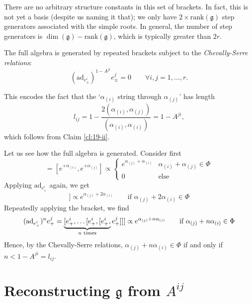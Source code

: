 
There are no arbitrary structure constants in this set of brackets.
In fact, this is not yet a basis (despite us naming it that); we only have $2 \times \text{rank}(\mathfrak{g})$ step generators associated with the simple roots. In general, the number of step generators is $\dim(\mathfrak{g}) - \text{rank}(\mathfrak{g})$, which is typically greater than $2r$.

The full algebra is generated by repeated brackets subject to the \emph{Chevally-Serre relations}:
\begin{equation}
  \boxed{(\text{ad}_{e^i_\pm})^{1 - A^{ji}} e_\pm^{j} = 0} \qquad \forall i, j = 1, \dots, r.
\end{equation}

This encodes the fact that the `$\alpha_{(i)}$ string through $\alpha_{(j)}$' has length
\begin{equation}
  l_{ij} = 1 - \frac{2(\alpha_{(i)}, \alpha_{(j)})}{(\alpha_{(i)}, \alpha_{(i)})} = 1 - A^{ji},
\end{equation}
which follows from Claim \ref{cl:19-ii}.

Let us see how the full algebra is generated. Consider first
\begin{equation}
  [e_+^{i}, e_+^{j}] = [e^{+\alpha_{(i)}}, e^{+\alpha_{(j)}}] \propto
  \begin{cases}
    e^{\alpha_{(j)} + \alpha_{(i)}} & \alpha_{(i)} + \alpha_{(j)} \in \Phi \\
    0 & \text{else}
  \end{cases}
\end{equation}
Applying $\text{ad}_{e^i_+}$ again, we get
\begin{equation}
  [e_+^{i}, [e_+^{i}, e_+^{j}]] \propto e^{\alpha_{(j)} + 2 \alpha_{(i)}} \qquad \text{if } \alpha_{(j)} + 2 \alpha_{(i)} \in \Phi
\end{equation}
Repeatedly applying the bracket, we find 
\begin{equation}
  (\text{ad}_{e_+^{i}})^n e^{j}_{+} = \underbrace{[e_+^{i}, \dots [e_+^{i}, [e_+^{i},}_{\mathclap{n \text{ times}}} e_+^{j}]]] \propto e^{\alpha_{(j)} + n \alpha_{(i)}} \qquad \text{if } \alpha_{(j)} + n \alpha_{(i)} \in \Phi
\end{equation}
Hence, by the Chevally-Serre relations, $\alpha_{(j)} + n \alpha_{(i)} \in \Phi$ if and only if $n < 1 - A^{ji} = l_{ij}$.


\section{Reconstructing \texorpdfstring{$\mathfrak{g}$}{the Lie Algebra} from \texorpdfstring{$A^{ij}$}{the Cartan Matrix}}%
\label{sec:reconstructing_g_from_a_ij}


